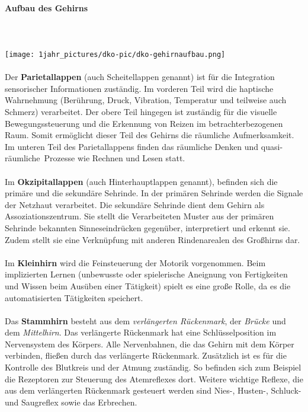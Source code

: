 \paragraph{Aufbau des Gehirns}~\\
\\
\texttt{[image: 1jahr\_pictures/dko-pic/dko-gehirnaufbau.png]}~\\
\\
Der {\bf Parietallappen} (auch Scheitellappen genannt) ist für die Integration sensorischer Informationen zuständig. Im vorderen Teil wird die haptische Wahrnehmung (Berührung, Druck, Vibration, Temperatur und teilweise auch Schmerz) verarbeitet. Der obere Teil hingegen ist zuständig für die visuelle Bewegungssteuerung und die Erkennung von Reizen im betrachterbezogenen Raum. Somit ermöglicht dieser Teil des Gehirns die räumliche Aufmerksamkeit. Im unteren Teil des Parietallappens finden das räumliche Denken und \ql quasi-räumliche\qr\ Prozesse wie Rechnen und Lesen statt.\\
\\
Im {\bf Okzipitallappen} (auch Hinterhauptlappen genannt), befinden sich die primäre und die sekundäre Sehrinde. In der primären Sehrinde werden die Signale der Netzhaut verarbeitet. Die sekundäre Sehrinde dient dem Gehirn als Assoziationszentrum. Sie stellt die Verarbeiteten Muster aus der primären Sehrinde bekannten Sinneseindrücken gegenüber, interpretiert und erkennt sie. Zudem stellt sie eine Verknüpfung mit anderen Rindenarealen des Großhirns dar.\\
\\
Im {\bf Kleinhirn} wird die Feinsteuerung der Motorik vorgenommen. Beim implizierten Lernen (unbewusste oder spielerische Aneignung von Fertigkeiten und Wissen beim Ausüben einer Tätigkeit) spielt es eine große Rolle, da es die automatisierten Tätigkeiten speichert.\\
\\
Das {\bf Stammhirn} besteht aus dem {\it verlängerten Rückenmark}, der {\it Brücke} und dem {\it Mittelhirn}. Das verlängerte Rückenmark hat eine Schlüsselposition im Nervensystem des Körpers. Alle Nervenbahnen, die das Gehirn mit dem Körper verbinden, fließen durch das verlängerte Rückenmark. Zusätzlich ist es für die Kontrolle des Blutkreis und der Atmung zuständig. So befinden sich zum Beispiel die Rezeptoren zur Steuerung des Atemreflexes dort. Weitere wichtige Reflexe, die aus dem verlängerten Rückenmark gesteuert werden sind Nies-, Husten-, Schluck- und Saugreflex sowie das Erbrechen. \\
